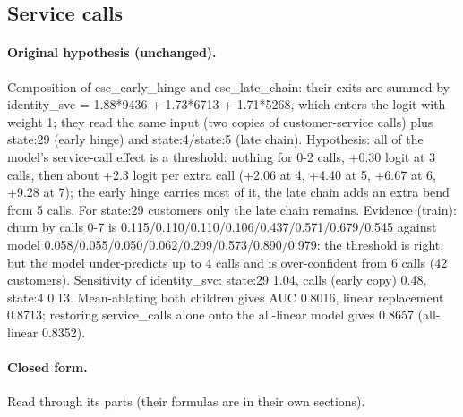 \documentclass[a4paper,10pt]{article}
\newif\ifreviewmarks
\newcommand{\reviewrule}{\noindent{\color{BrickRed}\rule{\linewidth}{0.8pt}}}
\newenvironment{drafted}[1][]{%
  \ifreviewmarks\par\addvspace{\medskipamount}\reviewrule\par\nopagebreak
  \noindent{\color{BrickRed}\sffamily\footnotesize\textbf{Thesis Draft}\quad #1\hfill review}\par\nopagebreak\smallskip\fi}{%
  \ifreviewmarks\par\smallskip\noindent{\color{BrickRed}\sffamily\footnotesize end of thesis draft}\par\nopagebreak\reviewrule\par\medskip\fi}
\begin{document}
\begin{drafted}[plain-language layer: churn100-s4-c3]
\subsection{Service calls}\label{tech:ann87}
\paragraph{Original hypothesis (unchanged).} Composition of csc\_\allowbreak{}early\_\allowbreak{}hinge and csc\_\allowbreak{}late\_\allowbreak{}chain: their exits are summed by identity\_\allowbreak{}svc = 1.88*9436 + 1.73*6713 + 1.71*5268, which enters the logit with weight 1; they read the same input (two copies of customer-service calls) plus state:29 (early hinge) and state:4/state:5 (late chain). Hypothesis: all of the model's service-call effect is a threshold: nothing for 0-2 calls, +0.30 logit at 3 calls, then about +2.3 logit per extra call (+2.06 at 4, +4.40 at 5, +6.67 at 6, +9.28 at 7); the early hinge carries most of it, the late chain adds an extra bend from 5 calls. For state:29 customers only the late chain remains. Evidence (train): churn by calls 0-7 is 0.115/\allowbreak{}0.110/\allowbreak{}0.110/\allowbreak{}0.106/\allowbreak{}0.437/\allowbreak{}0.571/\allowbreak{}0.679/\allowbreak{}0.545 against model 0.058/\allowbreak{}0.055/\allowbreak{}0.050/\allowbreak{}0.062/\allowbreak{}0.209/\allowbreak{}0.573/\allowbreak{}0.890/\allowbreak{}0.979: the threshold is right, but the model under-predicts up to 4 calls and is over-confident from 6 calls (42 customers). Sensitivity of identity\_\allowbreak{}svc: state:29 1.04, calls (early copy) 0.48, state:4 0.13. Mean-ablating both children gives AUC 0.8016, linear replacement 0.8713; restoring service\_\allowbreak{}calls alone onto the all-linear model gives 0.8657 (all-linear 0.8352).
\paragraph{Closed form.} Read through its parts (their formulas are in their own sections).

\end{drafted}
\end{document}
